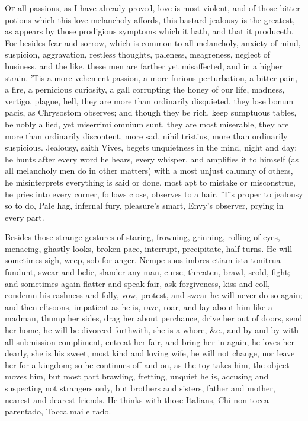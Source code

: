 {\lettrine{O}{f} all passions, as I have already proved, love is most violent, and of
those bitter potions which this love-melancholy affords, this bastard
jealousy is the greatest, as appears by those prodigious symptoms which
it hath, and that it produceth. For besides fear and sorrow, which is
common to all melancholy, anxiety of mind, suspicion, aggravation,
restless thoughts, paleness, meagreness, neglect of business, and the
like, these men are farther yet misaffected, and in a higher strain.
'Tis a more vehement passion, a more furious perturbation, a bitter
pain, a fire, a pernicious curiosity, a gall corrupting the honey of
our life, madness, vertigo, plague, hell, they are more than ordinarily
disquieted, they lose bonum pacis, as Chrysostom observes; and
though they be rich, keep sumptuous tables, be nobly allied, yet
miserrimi omnium sunt, they are most miserable, they are more than
ordinarily discontent, more sad, nihil tristius, more than ordinarily
suspicious. Jealousy, saith Vives, begets unquietness in the
mind, night and day: he hunts after every word he hears, every whisper,
and amplifies it to himself (as all melancholy men do in other matters)
with a most unjust calumny of others, he misinterprets everything is
said or done, most apt to mistake or misconstrue, he pries into every
corner, follows close, observes to a hair. 'Tis proper to jealousy so
to do,
Pale hag, infernal fury, pleasure's smart,
Envy's observer, prying in every part.

Besides those strange gestures of staring, frowning, grinning, rolling
of eyes, menacing, ghastly looks, broken pace, interrupt, precipitate,
half-turns. He will sometimes sigh, weep, sob for anger. Nempe suos
imbres etiam ista tonitrua fundunt,-swear and belie, slander any
man, curse, threaten, brawl, scold, fight; and sometimes again flatter
and speak fair, ask forgiveness, kiss and coll, condemn his rashness
and folly, vow, protest, and swear he will never do so again; and then
eftsoons, impatient as he is, rave, roar, and lay about him like a
madman, thump her sides, drag her about perchance, drive her out of
doors, send her home, he will be divorced forthwith, she is a whore,
\&c., and by-and-by with all submission compliment, entreat her fair,
and bring her in again, he loves her dearly, she is his sweet, most
kind and loving wife, he will not change, nor leave her for a kingdom;
so he continues off and on, as the toy takes him, the object moves him,
but most part brawling, fretting, unquiet he is, accusing and
suspecting not strangers only, but brothers and sisters, father and
mother, nearest and dearest friends. He thinks with those Italians,
Chi non tocca parentado,
Tocca mai e rado.

}
